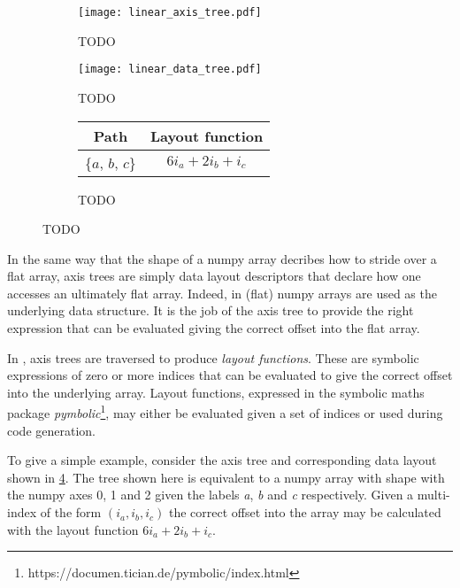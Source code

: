 \documentclass[thesis]{subfiles}
\begin{document}
\begin{figure}
  \centering
  \begin{subfigure}{.3\textwidth}
    \centering
    \texttt{[image: linear\_axis\_tree.pdf]}
    \caption{TODO}
    \label{fig:linear_axis_tree}
  \end{subfigure}
  \begin{subfigure}{.58\textwidth}
    \centering
    \texttt{[image: linear\_data\_tree.pdf]}
    \caption{TODO}
    \label{fig:linear_data_tree}
  \end{subfigure}

  \vspace{1em}

  \begin{subfigure}{\textwidth}
    \centering
    \begin{tabular}{|c|c|}
      \hline
      \textbf{Path} & \textbf{Layout function} \\
      \hline
      \{$a$, $b$, $c$\} & $6 i_a + 2 i_b + i_c$ \\
      \hline
    \end{tabular}
    \caption{TODO}
    \label{fig:multi_component_layouts}
  \end{subfigure}
  \caption{TODO}
  \label{fig:linear_axis_data_tree}
\end{figure}

In the same way that the shape of a numpy array decribes how to stride over a flat array, axis trees are simply data layout descriptors that declare how one accesses an ultimately flat array.
Indeed, in  (flat) numpy arrays are used as the underlying data structure.
It is the job of the axis tree to provide the right expression that can be evaluated giving the correct offset into the flat array.

In , axis trees are traversed to produce \textit{layout functions}.
These are symbolic expressions of zero or more indices that can be evaluated to give the correct offset into the underlying array.
Layout functions, expressed in the symbolic maths package \textit{pymbolic}\footnote{https://documen.tician.de/pymbolic/index.html}, may either be evaluated given a set of indices or used during code generation.

To give a simple example, consider the axis tree and corresponding data layout shown in \cref{fig:linear_axis_data_tree}.
The tree shown here is equivalent to a numpy array with shape  with the numpy axes 0, 1 and 2 given the labels \textit{a}, \textit{b} and \textit{c} respectively.
Given a multi-index of the form $(i_a, i_b, i_c)$ the correct offset into the array may be calculated with the layout function $6 i_a + 2 i_b + i_c$.
\end{document}
